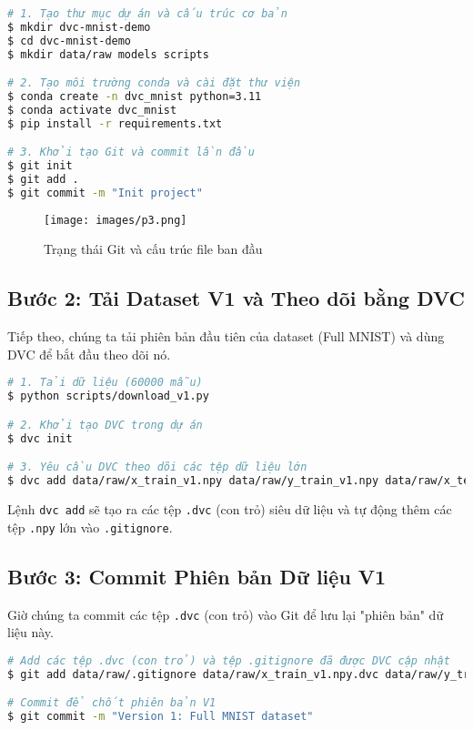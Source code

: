 \documentclass[11pt]{article}
\begin{document}
\begin{lstlisting}[language=bash]
# 1. Tạo thư mục dự án và cấu trúc cơ bản
$ mkdir dvc-mnist-demo
$ cd dvc-mnist-demo
$ mkdir data/raw models scripts

# 2. Tạo môi trường conda và cài đặt thư viện
$ conda create -n dvc_mnist python=3.11
$ conda activate dvc_mnist
$ pip install -r requirements.txt

# 3. Khởi tạo Git và commit lần đầu
$ git init
$ git add .
$ git commit -m "Init project"
\end{lstlisting}

\begin{figure}[H]
    \centering
    \texttt{[image: images/p3.png]}
    \caption{Trạng thái Git và cấu trúc file ban đầu}
\end{figure}

\subsection{Bước 2: Tải Dataset V1 và Theo dõi bằng DVC}
Tiếp theo, chúng ta tải phiên bản đầu tiên của dataset (Full MNIST) và dùng DVC để bắt đầu theo dõi nó.

\begin{lstlisting}[language=bash]
# 1. Tải dữ liệu (60000 mẫu)
$ python scripts/download_v1.py

# 2. Khởi tạo DVC trong dự án
$ dvc init

# 3. Yêu cầu DVC theo dõi các tệp dữ liệu lớn
$ dvc add data/raw/x_train_v1.npy data/raw/y_train_v1.npy data/raw/x_test.npy data/raw/y_test.npy
\end{lstlisting}
Lệnh \texttt{dvc add} sẽ tạo ra các tệp \texttt{.dvc} (con trỏ) siêu dữ liệu và tự động thêm các tệp \texttt{.npy} lớn vào \texttt{.gitignore}.

\subsection{Bước 3: Commit Phiên bản Dữ liệu V1}
Giờ chúng ta commit các tệp \texttt{.dvc} (con trỏ) vào Git để lưu lại "phiên bản" dữ liệu này.

\begin{lstlisting}[language=bash]
# Add các tệp .dvc (con trỏ) và tệp .gitignore đã được DVC cập nhật
$ git add data/raw/.gitignore data/raw/x_train_v1.npy.dvc data/raw/y_train_v1.npy.dvc data/raw/x_test.npy.dvc data/raw/y_test.npy.dvc

# Commit để chốt phiên bản V1
$ git commit -m "Version 1: Full MNIST dataset"
\end{lstlisting}
\end{document}
